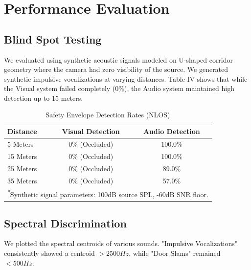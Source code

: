 \documentclass[conference]{IEEEtran}
\begin{document}
\section{Performance Evaluation}

\subsection{Blind Spot Testing}
We evaluated using synthetic acoustic signals modeled on U-shaped corridor geometry where the camera had zero visibility of the source. We generated synthetic impulsive vocalizations at varying distances.
Table IV shows that while the Visual system failed completely (0\%), the Audio system maintained high detection up to 15 meters.

\begin{table}[htbp]
\caption{Safety Envelope Detection Rates (NLOS)}
\begin{center}
\begin{tabular}{lcc}
\toprule
\textbf{Distance} & \textbf{Visual Detection} & \textbf{Audio Detection} \\
\midrule
5 Meters & 0\% (Occluded) & 100.0\% \\
15 Meters & 0\% (Occluded) & 100.0\% \\
25 Meters & 0\% (Occluded) & 89.0\% \\
35 Meters & 0\% (Occluded) & 57.0\% \\
\bottomrule
\multicolumn{3}{l}{\textsuperscript{*}\footnotesize Synthetic signal parameters: 100dB source SPL, -60dB SNR floor.}
\end{tabular}
\end{center}
\label{tab:blindspot}
\end{table}

\subsection{Spectral Discrimination}
We plotted the spectral centroids of various sounds. "Impulsive Vocalizations" consistently showed a centroid $>2500Hz$, while "Door Slams" remained $<500Hz$.
\end{document}

